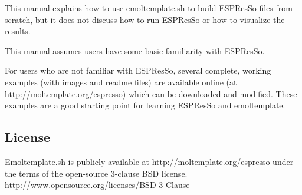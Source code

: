 \documentclass[11pt]{article}
\begin{document}

This manual explains how to use emoltemplate.sh to build ESPResSo 
files from scratch, but it does not discuss how to run ESPResSo
or how to visualize the results.

This manual assumes users have some basic familiarity with ESPResSo.

For users who are not familiar with ESPResSo, several complete, 
working examples (with images and readme files) are available online 
  (at \url{http://moltemplate.org/espresso})
which can be downloaded and modified.
These examples are a good starting point for learning ESPResSo and emoltemplate.



\subsection*{License}
Emoltemplate.sh is publicly available at \url{http://moltemplate.org/espresso} 
under the terms of the open-source 3-clause BSD license.
\url{http://www.opensource.org/licenses/BSD-3-Clause}
\end{document}
